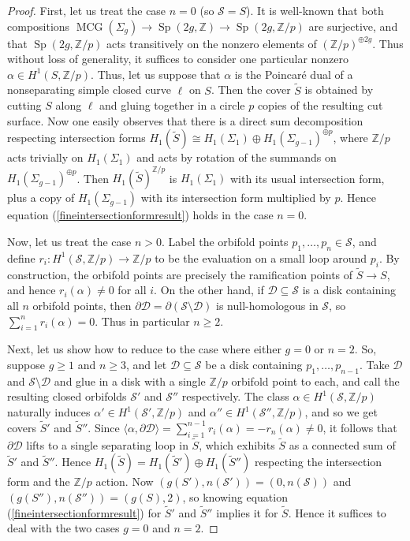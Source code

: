 \documentclass[12pt]{article}
\theoremstyle{plain}
\theoremstyle{definition}
\theoremstyle{remark}
\numberwithin{equation}{section}
\begin{document}
\begin{proof}
First, let us treat the case $n=0$ (so $\mathcal S=S$).  It is well-known that both compositions $\operatorname{MCG}(\Sigma_g)\to\operatorname{Sp}(2g,\mathbb Z)\to\operatorname{Sp}(2g,\mathbb Z/p)$ are surjective, and that $\operatorname{Sp}(2g,\mathbb Z/p)$ acts transitively on the nonzero elements of $(\mathbb Z/p)^{\oplus 2g}$.  Thus without loss of generality, it suffices to consider one particular nonzero $\alpha\in H^1(S,\mathbb Z/p)$.  Thus, let us suppose that $\alpha$ is the Poincar\'e dual of a nonseparating simple closed curve $\ell$ on $S$.  Then the cover $\tilde S$ is obtained by cutting $S$ along $\ell$ and gluing together in a circle $p$ copies of the resulting cut surface.  Now one easily observes that there is a direct sum decomposition respecting intersection forms $H_1(\tilde S)\cong H_1(\Sigma_1)\oplus H_1(\Sigma_{g-1})^{\oplus p}$, where $\mathbb Z/p$ acts trivially on $H_1(\Sigma_1)$ and acts by rotation of the summands on $H_1(\Sigma_{g-1})^{\oplus p}$.  Then $H_1(\tilde S)^{\mathbb Z/p}$ is $H_1(\Sigma_1)$ with its usual intersection form, plus a copy of $H_1(\Sigma_{g-1})$ with its intersection form multiplied by $p$.  Hence equation (\ref{fineintersectionformresult}) holds in the case $n=0$.

Now, let us treat the case $n>0$.  Label the orbifold points $p_1,\ldots,p_n\in\mathcal S$, and define $r_i:H^1(\mathcal S,\mathbb Z/p)\to\mathbb Z/p$ to be the evaluation on a small loop around $p_i$.  By construction, the orbifold points are precisely the ramification points of $\tilde S\to S$, and hence $r_i(\alpha)\ne 0$ for all $i$.  On the other hand, if $\mathcal D\subseteq\mathcal S$ is a disk containing all $n$ orbifold points, then $\partial\mathcal D=\partial(\mathcal S\setminus\mathcal D)$ is null-homologous in $\mathcal S$, so $\sum_{i=1}^nr_i(\alpha)=0$.  Thus in particular $n\geq 2$.

Next, let us show how to reduce to the case where either $g=0$ or $n=2$.  So, suppose $g\geq 1$ and $n\geq 3$, and let $\mathcal D\subseteq\mathcal S$ be a disk containing $p_1,\ldots,p_{n-1}$.  Take $\mathcal D$ and $\mathcal S\setminus\mathcal D$ and glue in a disk with a single $\mathbb Z/p$ orbifold point to each, and call the resulting closed orbifolds $\mathcal S'$ and $\mathcal S''$ respectively.  The class $\alpha\in H^1(\mathcal S,\mathbb Z/p)$ naturally induces $\alpha'\in H^1(\mathcal S',\mathbb Z/p)$ and $\alpha''\in H^1(\mathcal S'',\mathbb Z/p)$, and so we get covers $\tilde S'$ and $\tilde S''$.  Since $\langle\alpha,\partial\mathcal D\rangle=\sum_{i=1}^{n-1}r_i(\alpha)=-r_n(\alpha)\ne 0$, it follows that $\partial\mathcal D$ lifts to a single separating loop in $\tilde S$, which exhibits $\tilde S$ as a connected sum of $\tilde S'$ and $\tilde S''$.  Hence $H_1(\tilde S)=H_1(\tilde S')\oplus H_1(\tilde S'')$ respecting the intersection form and the $\mathbb Z/p$ action.  Now $(g(S'),n(\mathcal S'))=(0,n(\mathcal S))$ and $(g(S''),n(\mathcal S''))=(g(S),2)$, so knowing equation (\ref{fineintersectionformresult}) for $\tilde S'$ and $\tilde S''$ implies it for $\tilde S$.  Hence it suffices to deal with the two cases $g=0$ and $n=2$.


\end{proof}
\end{document}
